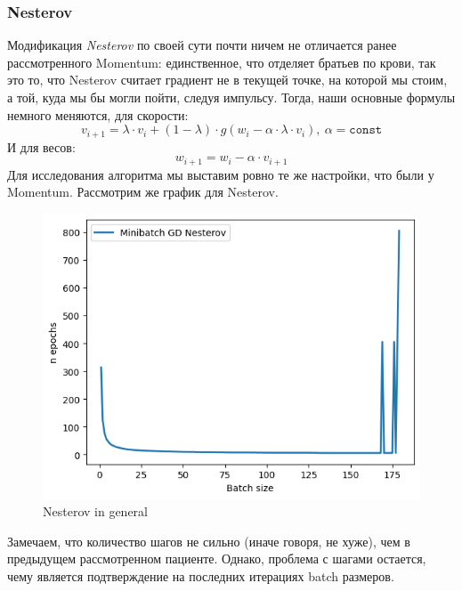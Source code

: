 \documentclass[12pt, a4paper, oneside, final]{article}
\begin{document}
	\subsubsection*{Nesterov}
	Модификация \textit{Nesterov} по своей сути почти ничем не отличается ранее рассмотренного Momentum: единственное, что отделяет братьев по крови, так это то, что Nesterov считает градиент не в текущей точке, на которой мы стоим, а той, куда мы бы могли пойти, следуя импульсу.
	Тогда, наши основные формулы немного меняются, для скорости:
	\[
		v_{i + 1} = \lambda \cdot v_{i} + (1 - \lambda) \cdot g(w_{i} - \alpha \cdot \lambda \cdot v_{i}), ~ \alpha = \mathtt{const}
	\]
	И для весов:
	\[
		w_{i + 1} = w_{i} - \alpha \cdot v_{i + 1}
	\]
	Для исследования алгоритма мы выставим ровно те же настройки, что были у Momentum.
	Рассмотрим же график для Nesterov.
	\begin{figure}[H]
		\centering
		\includegraphics[scale = 0.78]{Image/T3_NESTEROV_GENERAL.png}
		\caption*{Nesterov in general}
	\end{figure}
	Замечаем, что количество шагов не сильно (иначе говоря, не хуже), чем в предыдущем рассмотренном пациенте.
	Однако, проблема с шагами остается, чему является подтверждение на последних итерациях batch размеров.
\end{document}
